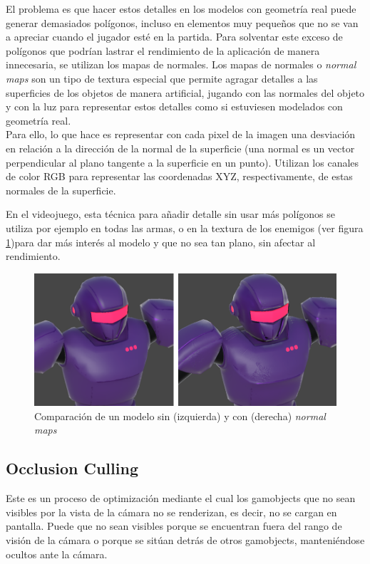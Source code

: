 El problema es que hacer estos detalles en los modelos con geometría real puede generar demasiados polígonos, incluso en elementos muy pequeños que no se van a apreciar cuando el jugador esté en la partida.
Para solventar este exceso de polígonos que podrían lastrar el rendimiento de la aplicación de manera innecesaria, se utilizan los mapas de normales.
Los mapas de normales o \textit{normal maps}\cite{wiki:NormalMaps} son un tipo de textura especial que permite agragar detalles a las superficies de los objetos de manera artificial, jugando con las normales del objeto y con la luz para representar estos detalles como si estuviesen modelados con geometría real.\\
Para ello, lo que hace es representar con cada pixel de la imagen una desviación en relación a la dirección de la normal de la superficie (una normal es un vector perpendicular al plano tangente a la superficie en un punto). Utilizan los canales de color RGB para representar las coordenadas XYZ, respectivamente, de estas normales de la superficie.

En el videojuego, esta técnica para añadir detalle sin usar más polígonos se utiliza por ejemplo en todas las armas, o en la textura de los enemigos (ver figura \ref{fig:ComparacionNormalMaps})para dar más interés al modelo y que no sea tan plano, sin afectar al rendimiento.

\begin{figure}[h]
	\centering
	\includegraphics[scale=0.4]{img/NormalMapsComparison.png}
	\caption{Comparación de un modelo sin (izquierda) y con (derecha) \textit{normal maps}}
	\label{fig:ComparacionNormalMaps}
    \end{figure}
    
\subsection{Occlusion Culling}
Este es un proceso de optimización mediante el cual los gamobjects que no sean visibles por la vista de la cámara no se renderizan, es decir, no se cargan en pantalla. Puede que no sean visibles porque se encuentran fuera del rango de visión de la cámara o porque se sitúan detrás de otros gamobjects, manteniéndose ocultos ante la cámara.

